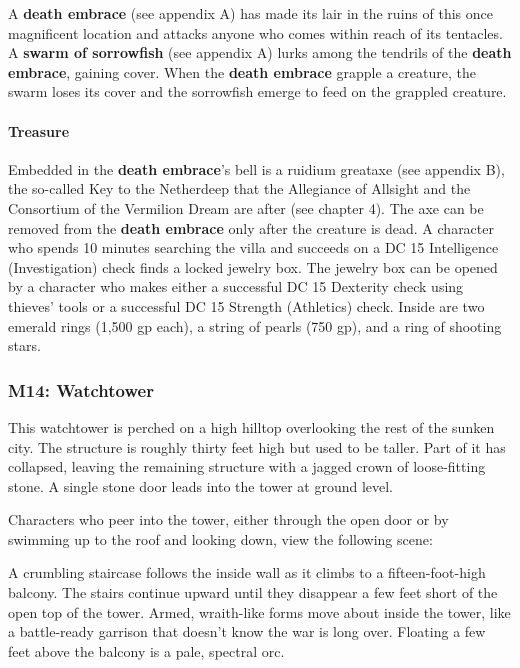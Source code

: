 \documentclass[10pt,a4,twoside,twocolumn,openany,nodeprecatedcode]{dndbook}
\begin{document}
A \textbf{death embrace} (see appendix A) has made its lair in the ruins of this once magnificent location and attacks anyone who comes within reach of its tentacles. A \textbf{swarm of sorrowfish} (see appendix A) lurks among the tendrils of the \textbf{death embrace}, gaining cover. When the \textbf{death embrace} grapple a creature, the swarm loses its cover and the sorrowfish emerge to feed on the grappled creature.
\paragraph{Treasure}
Embedded in the \textbf{death embrace}'s bell is a ruidium greataxe (see appendix B), the so-called Key to the Netherdeep that the Allegiance of Allsight and the Consortium of the Vermilion Dream are after (see chapter 4). The axe can be removed from the \textbf{death embrace} only after the creature is dead.
A character who spends 10 minutes searching the villa and succeeds on a DC 15 Intelligence (Investigation) check finds a locked jewelry box. The jewelry box can be opened by a character who makes either a successful DC 15 Dexterity check using thieves' tools or a successful DC 15 Strength (Athletics) check. Inside are two emerald rings (1,500 gp each), a string of pearls (750 gp), and a ring of shooting stars.
\subsubsection{M14: Watchtower}
\begin{DndReadAloud}{}
This watchtower is perched on a high hilltop overlooking the rest of the sunken city. The structure is roughly thirty feet high but used to be taller. Part of it has collapsed, leaving the remaining structure with a jagged crown of loose-fitting stone. A single stone door leads into the tower at ground level.
\end{DndReadAloud}

Characters who peer into the tower, either through the open door or by swimming up to the roof and looking down, view the following scene:
\begin{DndReadAloud}{}
A crumbling staircase follows the inside wall as it climbs to a fifteen-foot-high balcony. The stairs continue upward until they disappear a few feet short of the open top of the tower. Armed, wraith-like forms move about inside the tower, like a battle-ready garrison that doesn't know the war is long over. Floating a few feet above the balcony is a pale, spectral orc.
\end{DndReadAloud}
\end{document}
